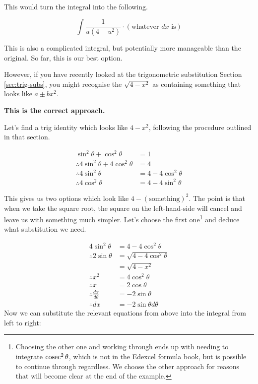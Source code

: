 \begin{solution}
    This would turn the integral into the following.

    \[ \int \frac{1}{u(4-u^2)}\cdot (\text{whatever }dx\text{ is})\]

    This is also a complicated integral, but potentially more manageable than the original. So far, this is our best option.

    However, if you have recently looked at the trigonometric substitution Section \ref{sec:trig-subs}, you might recognise the $\sqrt{4 - x^2}$ as containing something that looks like $a \pm bx^2$.

    \textbf{This is the correct approach.}

    Let's find a trig identity which looks like $4 - x^2$, following the procedure outlined in that section.

    \begin{align*}
        \sin^2\theta + \cos^2 \theta &= 1 \\ 
        \therefore 4\sin^2\theta + 4\cos^2 \theta &= 4 \\ 
        \therefore 4 \sin^2 \theta &= 4 - 4\cos^2 \theta \\ 
        \therefore 4 \cos^2 \theta &= 4 - 4 \sin^2 \theta
    \end{align*}

    This gives us two options which look like $4 - (\text{something})^2$. The point is that when we take the square root, the square on the left-hand-side will cancel and leave us with something much simpler. 
    Let's choose the first one\footnote{Choosing the other one and working through ends up with needing to integrate $\operatorname{cosec}^2 \theta$, which is not in the Edexcel formula book, but is possible to continue through regardless. We choose the other approach for reasons that will become clear at the end of the example.}
    and deduce what substitution we need.

    \begin{align*}
        4 \sin^2 \theta &= 4 - 4\cos^2 \theta \\  
        \therefore 2 \sin \theta &= \sqrt{4 - 4\cos^2 \theta} \tag{what we want to use}\\
         &= \sqrt{4 - x^2} \tag{what we want to replace}\\
         \therefore x^2 &= 4\cos^2 \theta \tag{what we need to be true}\\
         \therefore x &= 2 \cos \theta \tag{what the substitution is}\\
         \therefore \frac{dx}{d\theta} &= -2\sin \theta \tag{for $dx$}\\
         \therefore dx &= -2\sin \theta  d\theta \tag{pretending to rearrange for $dx$} 
    \end{align*}
    Now we can substitute the relevant equations from above into the integral from left to right:


\end{solution}
